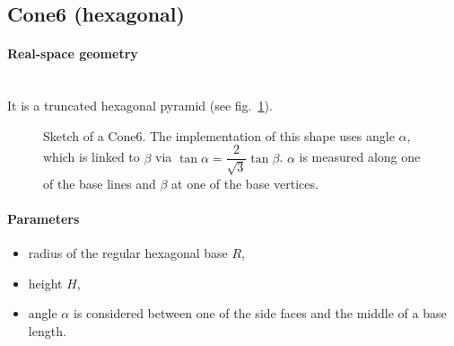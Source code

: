 \newpage
\subsection{Cone6 (hexagonal)} 

\paragraph{Real-space geometry}\strut\\
It is a truncated hexagonal pyramid (see fig.~\ref{fig:cone6}). 

\begin{figure}[ht]
\hfill
{}
\hfill
{}
\hfill
\caption{Sketch of a Cone6.  The implementation of this shape uses angle
  $\alpha$, which is linked to $\beta$ via $\tan \alpha = \dfrac{2}{\sqrt{3}} \tan 
  \beta$. $\alpha$ is measured along one of the base lines and $\beta$
  at one of the base vertices.}
\label{fig:cone6}
\end{figure}

\FloatBarrier

\paragraph{Parameters}
\begin{itemize}
\item radius of the regular hexagonal base $R$,
\item height $H$,
\item angle $\alpha$ is considered between one of the side faces and
  the middle of a base length. 
\end{itemize}


